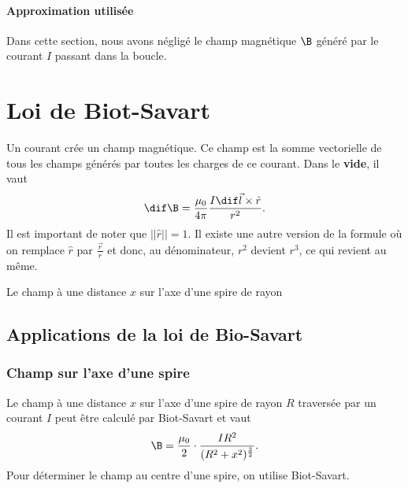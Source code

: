 \paragraph{Approximation utilisée}
Dans cette section, nous avons négligé le champ magnétique $\B$
généré par le courant $I$ passant dans la boucle.

\section{Loi de Biot-Savart}
\label{sec:bs}
Un courant crée un champ magnétique.
Ce champ est la somme vectorielle de tous les champs
générés par toutes les charges de ce courant.
Dans le \textbf{vide}, il vaut
\[ \dif\B = \frac{\mu_0}{4\pi}\frac{I\dif \vec l\times \hat r}{r^2}. \]
Il est important de noter que $||\hat r|| = 1$.
Il existe une autre version de la formule où on remplace $\hat r$ par
$\frac{\vec r}{r}$ et donc, au dénominateur,
$r^2$ devient $r^3$, ce qui revient au même.

Le champ à une distance $x$ sur l'axe d'une spire de rayon
\subsection{Applications de la loi de Bio-Savart}
\subsubsection{Champ sur l'axe d'une spire}
Le champ à une distance $x$ sur l'axe d'une spire de rayon
$R$ traversée par un courant $I$ peut être calculé par Biot-Savart et vaut
\[ \B = \frac{\mu_0}{2}\cdot\frac{IR^2}{(R^2 + x^2)^{\frac{3}{2}}}. \]
Pour déterminer le champ au centre d'une spire, on utilise Biot-Savart.

